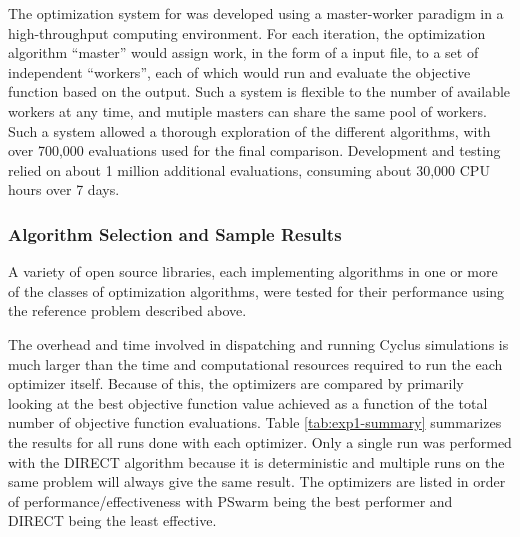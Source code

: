 The optimization system for \Cyclus{} was developed using a master-worker
paradigm in a high-throughput computing environment.  For each iteration, the
optimization algorithm ``master'' would assign work, in the form of a
\Cyclus{} input file, to a set of independent ``workers'', each of which would
run \Cyclus{} and evaluate the objective function based on the output.  Such a
system is flexible to the number of available workers at any time, and mutiple
masters can share the same pool of workers.  Such a system allowed a thorough
exploration of the different algorithms, with over 700,000 \Cyclus{}
evaluations used for the final comparison.  Development and testing relied on
about 1 million additional \Cyclus{} evaluations, consuming about 30,000 CPU
hours over 7 days.

\subsubsection{Algorithm Selection and Sample Results}

A variety of open source libraries, each implementing algorithms in one or
more of the classes of optimization algorithms, were tested for their
performance using the reference problem described above.

The overhead and time involved in dispatching and running Cyclus simulations
is much larger than the time and computational resources required to run the
each optimizer itself. Because of this, the optimizers are compared by
primarily looking at the best objective function value achieved as a function
of the total number of objective function evaluations.  Table
\ref{tab:exp1-summary} summarizes the results for all runs done with each
optimizer.  Only a single run was performed with the DIRECT algorithm because
it is deterministic and multiple runs on the same problem will always give the
same result.  The optimizers are listed in order of performance/effectiveness
with PSwarm being the best performer and DIRECT being the least effective.

